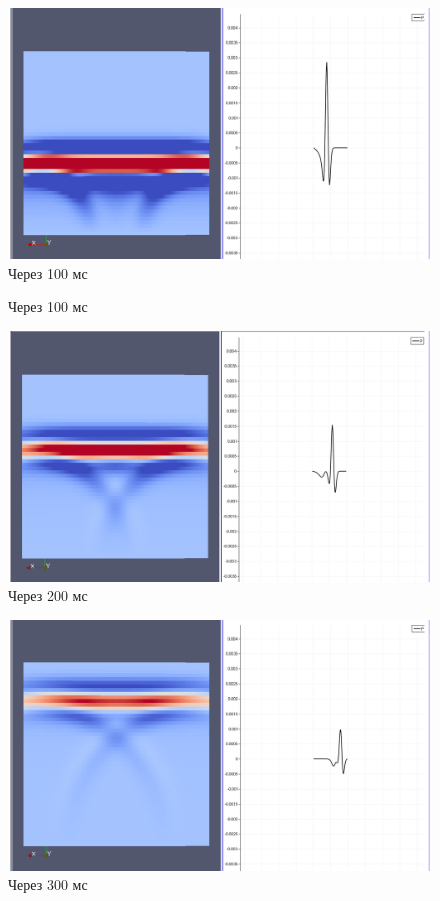 \documentclass{article}
\begin{document}
\begin{figure}[ht]
  \center
  \includegraphics[scale=0.2]{pic_kirchhoff_scalar/t1.png}
  \caption{Через 100 мс}
\label{img_snapshot_1}
\end{figure}
\begin{figure}[ht]
  \center
  \caption{Через 100 мс}
  \includegraphics[scale=0.2]{pic_kirchhoff_scalar/t2.png}
  \caption{Через 200 мс}
\label{img_snapshot_2}
\end{figure}
\begin{figure}[ht]
  \center
  \includegraphics[scale=0.2]{pic_kirchhoff_scalar/t3.png}
  \caption{Через 300 мс}
\label{img_snapshot_3}
\end{figure}
\end{document}
